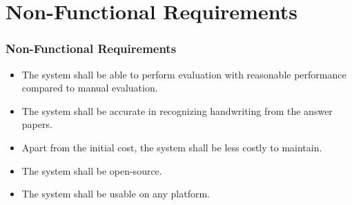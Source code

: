 \section{Non-Functional Requirements}
\begin{frame}
\frametitle{Non-Functional Requirements}
\begin{itemize}
    \item The system shall be able to perform evaluation with
    reasonable performance compared to manual evaluation.
    \item The system shall be accurate in recognizing handwriting
    from the answer papers.
    \item Apart from the initial cost, the system shall be less
    costly to maintain.
    \item The system shall be open-source.
    \item The system shall be usable on any platform.
\end{itemize}
\end{frame}